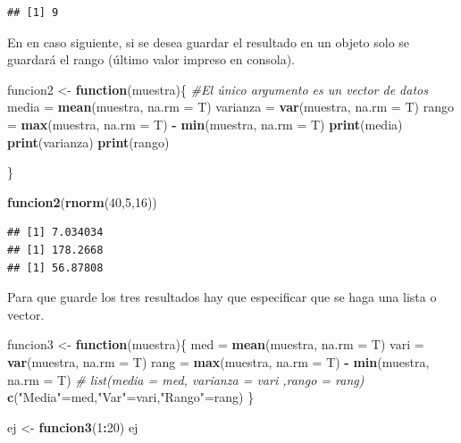 \documentclass[]{book}
\newenvironment{Shaded}{\begin{snugshade}}{\end{snugshade}}
\newcommand{\KeywordTok}[1]{\textcolor[rgb]{0.13,0.29,0.53}{\textbf{#1}}}
\newcommand{\DataTypeTok}[1]{\textcolor[rgb]{0.13,0.29,0.53}{#1}}
\newcommand{\DecValTok}[1]{\textcolor[rgb]{0.00,0.00,0.81}{#1}}
\newcommand{\StringTok}[1]{\textcolor[rgb]{0.31,0.60,0.02}{#1}}
\newcommand{\CommentTok}[1]{\textcolor[rgb]{0.56,0.35,0.01}{\textit{#1}}}
\newcommand{\ControlFlowTok}[1]{\textcolor[rgb]{0.13,0.29,0.53}{\textbf{#1}}}
\newcommand{\OperatorTok}[1]{\textcolor[rgb]{0.81,0.36,0.00}{\textbf{#1}}}
\newcommand{\NormalTok}[1]{#1}
\begin{document}
\begin{verbatim}
## [1] 9
\end{verbatim}

En en caso siguiente, si se desea guardar el resultado en un objeto solo
se guardará el rango (último valor impreso en consola).

\begin{Shaded}
\begin{Highlighting}[]
\NormalTok{funcion2 <-}\StringTok{ }\ControlFlowTok{function}\NormalTok{(muestra)\{     }\CommentTok{#El único argumento es un vector de datos}
\NormalTok{  media =}\StringTok{ }\KeywordTok{mean}\NormalTok{(muestra, }\DataTypeTok{na.rm =}\NormalTok{ T)}
\NormalTok{  varianza =}\StringTok{ }\KeywordTok{var}\NormalTok{(muestra, }\DataTypeTok{na.rm =}\NormalTok{ T)}
\NormalTok{  rango =}\StringTok{ }\KeywordTok{max}\NormalTok{(muestra, }\DataTypeTok{na.rm =}\NormalTok{ T) }\OperatorTok{-}\StringTok{ }\KeywordTok{min}\NormalTok{(muestra, }\DataTypeTok{na.rm =}\NormalTok{ T)}
  \KeywordTok{print}\NormalTok{(media)}
  \KeywordTok{print}\NormalTok{(varianza)}
  \KeywordTok{print}\NormalTok{(rango)}

\NormalTok{\}}

\KeywordTok{funcion2}\NormalTok{(}\KeywordTok{rnorm}\NormalTok{(}\DecValTok{40}\NormalTok{,}\DecValTok{5}\NormalTok{,}\DecValTok{16}\NormalTok{))}
\end{Highlighting}
\end{Shaded}

\begin{verbatim}
## [1] 7.034034
## [1] 178.2668
## [1] 56.87808
\end{verbatim}

Para que guarde los tres resultados hay que especificar que se haga una
lista o vector.

\begin{Shaded}
\begin{Highlighting}[]
\NormalTok{funcion3 <-}\StringTok{ }\ControlFlowTok{function}\NormalTok{(muestra)\{     }
\NormalTok{  med =}\StringTok{ }\KeywordTok{mean}\NormalTok{(muestra, }\DataTypeTok{na.rm =}\NormalTok{ T)}
\NormalTok{  vari =}\StringTok{ }\KeywordTok{var}\NormalTok{(muestra, }\DataTypeTok{na.rm =}\NormalTok{ T)}
\NormalTok{  rang =}\StringTok{ }\KeywordTok{max}\NormalTok{(muestra, }\DataTypeTok{na.rm =}\NormalTok{ T) }\OperatorTok{-}\StringTok{ }\KeywordTok{min}\NormalTok{(muestra, }\DataTypeTok{na.rm =}\NormalTok{ T)}
  \CommentTok{# list(media = med, varianza = vari ,rango = rang)}
  \KeywordTok{c}\NormalTok{(}\StringTok{"Media"}\NormalTok{=med,}\StringTok{"Var"}\NormalTok{=vari,}\StringTok{"Rango"}\NormalTok{=rang)}
\NormalTok{\}}

\NormalTok{ej <-}\StringTok{ }\KeywordTok{funcion3}\NormalTok{(}\DecValTok{1}\OperatorTok{:}\DecValTok{20}\NormalTok{)}
\NormalTok{ej}
\end{Highlighting}
\end{Shaded}
\end{document}

